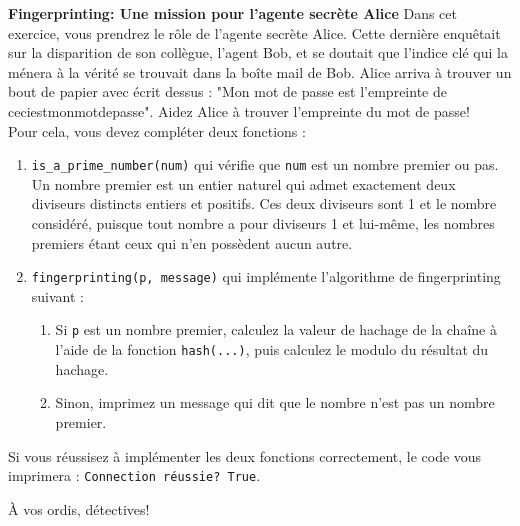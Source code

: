 \begin{Exercice}[20 minutes]\textbf{Fingerprinting: Une mission pour l'agente secrète Alice}
    Dans cet exercice, vous prendrez le rôle de l'agente secrète Alice. Cette dernière enquêtait sur la disparition de son collègue,
    l'agent Bob, et se doutait que l'indice clé qui la ménera à la vérité se trouvait dans la boîte mail de Bob. Alice arriva à trouver
    un bout de papier avec écrit dessus : "Mon mot de passe est l'empreinte de ceciestmonmotdepasse". Aidez Alice à trouver l'empreinte du mot de passe! \\

    Pour cela, vous devez compléter deux fonctions :
    \begin{enumerate}
        \item \lstinline{is_a_prime_number(num)} qui vérifie que \lstinline{num} est un nombre premier ou pas. Un nombre premier est un entier naturel 
        qui admet exactement deux diviseurs distincts entiers et positifs. Ces deux diviseurs sont 1 et le nombre considéré, 
        puisque tout nombre a pour diviseurs 1 et lui-même, les nombres premiers étant ceux qui n’en possèdent aucun autre.
        
        \item \lstinline{fingerprinting(p, message)} qui implémente l'algorithme de fingerprinting suivant :
              \begin{enumerate}
                  \item Si \lstinline{p} est un nombre premier, calculez la valeur de hachage de la chaîne à l'aide de la fonction \lstinline{hash(...)}, puis calculez le modulo du résultat du hachage.
                  \item Sinon, imprimez un message qui dit que le nombre n'est pas un nombre premier.    
              \end{enumerate}
    \end{enumerate}

    Si vous réussisez à implémenter les deux fonctions correctement, le code vous imprimera : \lstinline{Connection réussie? True}.

    À vos ordis, détectives!

    

    \begin{solution}
        
    \end{solution}

    
\end{Exercice}


